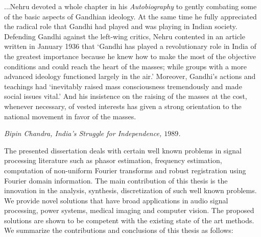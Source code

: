 \documentclass{UCF_ETD}
\begin{document}
\epigraph{...Nehru devoted a whole chapter in his \emph{Autobiography} to gently combating some of the basic aspects of Gandhian ideology. At the same time he fully appreciated the radical role that Gandhi had played and was playing in Indian society. Defending Gandhi against the left-wing critics, Nehru contented in an article written in January 1936 that `Gandhi has played a revolutionary role in India of the greatest importance because he knew how to make the most of the objective conditions and could reach the heart of the masses; while groups with a more advanced ideology functioned largely in the air.' Moreover, Gandhi's actions and teachings had `inevitably raised mass consciousness tremendously and made social issues vital.' And his insistence on the raising of the masses at the cost, whenever necessary, of vested interests has given a strong orientation to the national movement in favor of the masses.}{\itshape Bipin Chandra, India's Struggle for Independence, $1989$.}

The presented dissertation deals with certain well known problems in signal processing literature such as phasor estimation, frequency estimation, computation of non-uniform Fourier transforms and robust registration using Fourier domain information. The main contribution of this thesis is the innovation in the analysis, synthesis, discretization of such well known problems. We provide novel solutions that have broad applications in audio signal processing, power systems, medical imaging and computer vision. The proposed solutions are shown to be competent with the existing state of the art methods. We summarize the contributions and conclusions of this thesis as follows:
\end{document}
